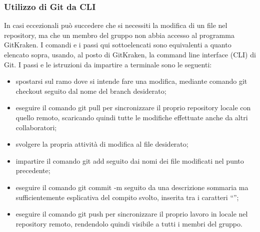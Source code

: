 \subsubsection{Utilizzo di Git da CLI}
In casi eccezionali può succedere che si necessiti la modifica di un file nel repository, ma che un membro del gruppo {\Gruppo} non abbia accesso al programma GitKraken. I comandi e i passi qui sottoelencati sono equivalenti a quanto elencato sopra, usando, al posto di GitKraken, la command line interface (CLI) di Git. I passi e le istruzioni da impartire a terminale sono le seguenti:
\begin{itemize}
	\item spostarsi sul ramo dove si intende fare una modifica, mediante comando git checkout seguito dal nome del branch desiderato;
	\item eseguire il comando git pull per sincronizzare il proprio repository locale con quello remoto, scaricando quindi tutte le modifiche effettuate anche da altri collaboratori;
	\item svolgere la propria attività di modifica al file desiderato;
	\item impartire il comando git add seguito dai nomi dei file modificati nel punto precedente;
	\item eseguire il comando git commit -m seguito da una descrizione sommaria ma sufficientemente esplicativa del compito svolto, inserita tra i caratteri “”;
	\item eseguire il comando git push per sincronizzare il proprio lavoro in locale nel repository remoto, rendendolo quindi visibile a tutti i membri del gruppo.
\end{itemize}


